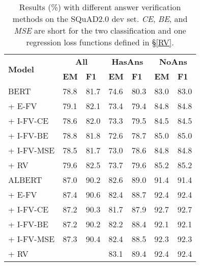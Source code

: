 \documentclass[letterpaper]{article} \usepackage{aaai21}  \usepackage{times}  \usepackage{helvet} \usepackage{courier}  \usepackage[hyphens]{url}  \usepackage{graphicx}
\begin{document}
\begin{table}
	\begin{center}
\setlength{\tabcolsep}{5pt}
		{
			\begin{tabular}{lllllll}
				\toprule
				\multirow{2}{*}{\textbf{Model}} & \multicolumn{2}{c}{\textbf{All}} & \multicolumn{2}{c}{\textbf{HasAns}} & \multicolumn{2}{c}{\textbf{NoAns}} \\
				& \textbf{EM} & \textbf{F1} & \textbf{EM} & \textbf{F1} & \textbf{EM} & \textbf{F1} \\
				
				\midrule
				BERT  & 78.8 & 81.7  & 74.6 & 80.3 & 83.0 & 83.0 \\
				\quad     + E-FV  & 79.1 & 82.1 & 73.4 & 79.4  & 84.8 & 84.8  \\
				\quad     + I-FV-CE  & 78.6 & 82.0 & 73.3 & 79.5 & 84.5 & 84.5\\
				\quad + I-FV-BE & 78.8 & 81.8 & 72.6 & 78.7 & 85.0 & 85.0\\
				\quad     + I-FV-MSE  & 78.5 & 81.7& 73.0 & 78.6 & 84.8 & 84.8  \\
				\quad     + RV  & 79.6 & 82.5 & 73.7 & 79.6  & 85.2 & 85.2  \\
				\midrule 
ALBERT  &  87.0 & 90.2 & 82.6 & 89.0 & 91.4 &  91.4  \\
				\quad     + E-FV  & 87.4 & 90.6  & 82.4 & 88.7  & 92.4 &  92.4\\
				\quad   + I-FV-CE  & 87.2 & 90.3 & 81.7 & 87.9 & 92.7 & 92.7 \\
				\quad + I-FV-BE & 87.2 & 90.2 &82.2 &88.4 &92.1 &92.1 \\
				\quad     + I-FV-MSE & 87.3 & 90.4 & 82.4 & 88.5 & 92.3 & 92.3 \\
				\quad      + RV  & \text{87.8} & \text{90.9}  & 83.1 & 89.4 &92.4  &  92.4 \\
				\bottomrule 
			\end{tabular}
		}
	\end{center}
	\caption{\label{tablescore} Results (\%) with different answer verification methods on the SQuAD2.0 dev set. \textit{CE}, \textit{BE}, and \textit{MSE} are short for the two classification and one regression loss functions defined in \S\ref{RV}.}
\end{table}
\end{document}
